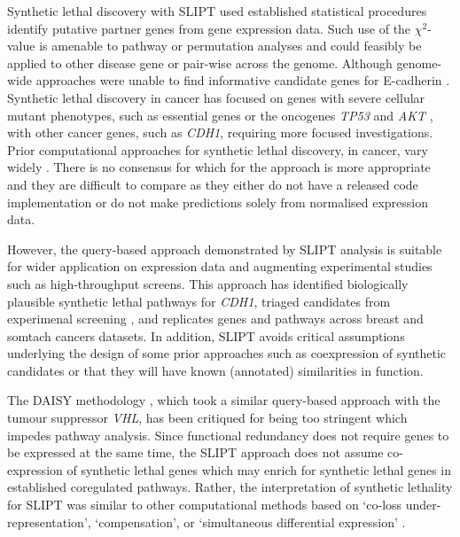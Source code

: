 Synthetic lethal discovery  with SLIPT used established statistical procedures identify putative partner genes from gene expression data. Such use of the $\chi^2$-value is amenable to pathway or permutation analyses and could feasibly be applied to other disease gene or pair-wise across the genome. Although genome-wide approaches were unable to find informative candidate genes for E-cadherin \cite{Lu2015}. Synthetic lethal discovery in cancer has focused on genes with severe cellular mutant phenotypes, such as essential genes or the oncogenes \textit{TP53} and \textit{AKT} \cite{Tiong2014, Lu2015, Wang2013}, with other cancer genes, such as \textit{CDH1}, requiring more focused investigations. Prior computational approaches for synthetic lethal discovery, in cancer, vary widely \citep{Tiong2014, Jerby2014, Lu2015, Wappett2016}. There is no consensus for which for the approach is more appropriate and they are difficult to compare as they either do not have a released code implementation or do not make predictions solely from normalised expression data.

However, the query-based approach demonstrated by SLIPT analysis is suitable for wider application on expression data and augmenting experimental studies such as high-throughput screens. This approach has identified biologically plausible synthetic lethal pathways for \textit{CDH1}, triaged candidates from experimenal screening \citep{Telford2015}, and replicates genes and pathways across breast and somtach cancers datasets. In addition, SLIPT avoids critical assumptions underlying the design of some prior approaches such as coexpression of synthetic candidates or that they will have known (annotated) similarities in function.

The DAISY methodology \cite{Jerby2014}, which took a similar query-based approach with the tumour suppressor \textit{VHL}, has been critiqued for being too stringent \cite{Lu2015} which impedes pathway analysis. Since functional redundancy does not require genes to be expressed at the same time, the SLIPT approach does not assume co-expression of synthetic lethal genes which may enrich for synthetic lethal genes in established coregulated pathways. Rather, the interpretation of synthetic lethality for SLIPT was similar to other computational methods based on `co-loss under-represent\-at\-ion', `compensation', or `simultaneous differential expression' \cite{Tiong2014, Lu2015, Wang2013}.

